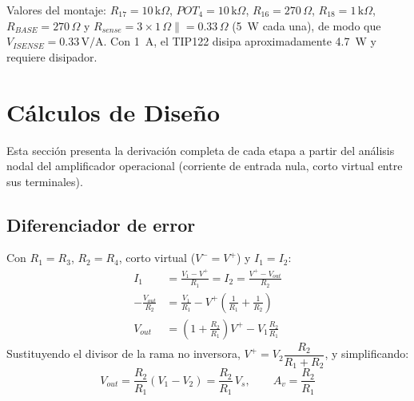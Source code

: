 \documentclass[conference]{IEEEtran}
\begin{document}
Valores del montaje: $R_{17}=10\,\text{k}\Omega$, $POT_4=10\,\text{k}\Omega$, $R_{16}=270\,\Omega$, $R_{18}=1\,\text{k}\Omega$, $R_{BASE}=270\,\Omega$ y $R_{sense}=3\times1\,\Omega\parallel=0.33\,\Omega$ (5~W cada una), de modo que $V_{ISENSE}=0.33\,\text{V/A}$. Con 1~A, el TIP122 disipa aproximadamente 4.7~W y requiere disipador.

\section{Cálculos de Diseño}

Esta sección presenta la derivación completa de cada etapa a partir del análisis nodal del amplificador operacional (corriente de entrada nula, corto virtual entre sus terminales).

\subsection{Diferenciador de error}
Con $R_1=R_3$, $R_2=R_4$, corto virtual ($V^-=V^+$) y $I_1=I_2$:
\begin{align}
I_1 &= \frac{V_1-V^+}{R_1} = I_2 = \frac{V^+-V_{out}}{R_2} \\
-\frac{V_{out}}{R_2} &= \frac{V_1}{R_1}-V^+\left(\frac{1}{R_1}+\frac{1}{R_2}\right) \\
V_{out} &= \left(1+\frac{R_2}{R_1}\right)V^+ - V_1\frac{R_2}{R_1}
\end{align}
Sustituyendo el divisor de la rama no inversora, $V^+=V_2\dfrac{R_2}{R_1+R_2}$, y simplificando:
\begin{equation}
\boxed{V_{out}=\frac{R_2}{R_1}\left(V_1-V_2\right)=\frac{R_2}{R_1}\,V_s}, \qquad A_v=\frac{R_2}{R_1}
\label{eq:diff_full}
\end{equation}
\end{document}
